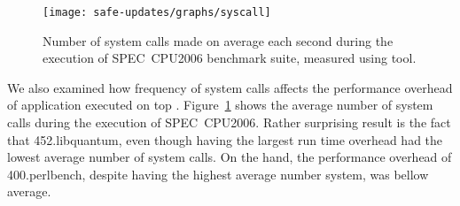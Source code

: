 

\begin{figure}[ht]
\begin{center}
\texttt{[image: safe-updates/graphs/syscall]}
\caption{Number of system calls made on average each second during the
execution of SPEC~CPU2006 benchmark suite, measured using 
tool.}
\label{fig:syscall}
\end{center}
\end{figure}

We also examined how frequency of system calls affects the performance
overhead of application executed on top \mx. Figure~\ref{fig:syscall} shows
the average number of system calls during the execution of SPEC~CPU2006.
Rather surprising result is the fact that \textsf{452.libquantum}, even though having
the largest run time overhead had the lowest average number of system calls.
On the hand, the performance overhead of \textsf{400.perlbench}, despite having the
highest average number system, was bellow average. 

